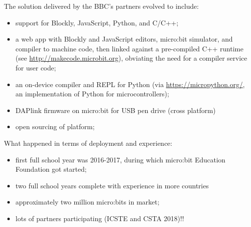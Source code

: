 
The solution delivered by the BBC's partners evolved to include:
\begin{itemize}
\item support for Blockly, JavaScript, Python, and C/C++;
\item a web app with Blockly and JavaScript editors, micro:bit simulator, 
and compiler to machine code, then linked against a pre-compiled C++ runtime 
(see \url{http://makecode.microbit.org}), obviating the need for a compiler service for user code;
\item an on-device compiler and REPL for Python (via \url{https://micropython.org/}, 
an implementation of Python for microcontrollers);
\item DAPlink firmware on micro:bit for USB pen drive (cross platform)
\item open sourcing of platform;
\end{itemize}
What happened in terms of deployment and experience:
\begin{itemize}
\item first full school year was 2016-2017, during which micro:bit Education Foundation got
started; 
\item two full school years complete with experience in more countries
\item approximately two million micro:bits in market;
\item lots of partners participating (ICSTE and CSTA 2018)!!
\end{itemize}





